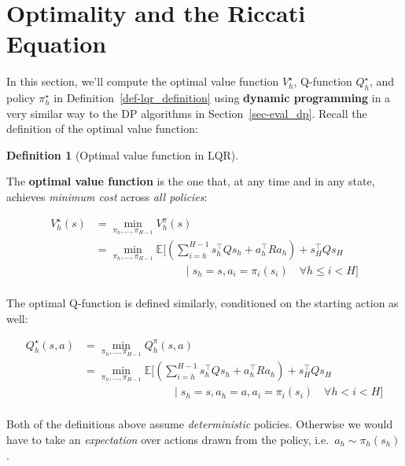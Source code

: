 \documentclass[
  letterpaper,
  DIV=11,
  numbers=noendperiod]{scrreprt}
\theoremstyle{plain}
\theoremstyle{plain}
\theoremstyle{definition}
\theoremstyle{definition}
\newtheorem{definition}{Definition}[chapter]
\theoremstyle{remark}
\begin{document}
\section{Optimality and the Riccati Equation}\label{sec-optimal_lqr}

In this section, we'll compute the optimal value function \(V^\star_h\),
Q-function \(Q^\star_h\), and policy \(\pi^\star_h\) in
Definition~\ref{def-lqr_definition} using \textbf{dynamic programming}
in a very similar way to the DP algorithms in Section~\ref{sec-eval_dp}.
Recall the definition of the optimal value function:

\begin{definition}[Optimal value function in
LQR]\protect\hypertarget{def-optimal_value_lqr}{}\label{def-optimal_value_lqr}

The \textbf{optimal value function} is the one that, at any time and in
any state, achieves \emph{minimum cost} across \emph{all policies}:

\[
\begin{split}
    V^\star_h(s) &= \min_{\pi_h, \dots, \pi_{H-1}} V^\pi_h(s) \\
    &= \min_{\pi_{h}, \dots, \pi_{H-1}} \mathbb{E}\bigg[ \left( \sum_{i=h}^{H-1} s_h^\top Q s_h+ a_h^\top R a_h\right) + s_H^\top Q s_H\\
        &\hspace{8em} \mid s_h= s, a_i = \pi_i(s_i) \quad \forall h\le i < H \bigg] \\
\end{split}
\]

The optimal Q-function is defined similarly, conditioned on the starting
action as well:

\[
\begin{split}
    Q^\star_h(s, a) &= \min_{\pi_h, \dots, \pi_{H-1}} Q^\pi_h(s, a) \\
    &= \min_{\pi_{h}, \dots, \pi_{H-1}} \mathbb{E}\bigg[ \left( \sum_{i=h}^{H-1} s_h^\top Q s_h+ a_h^\top R a_h\right) + s_H^\top Q s_H\\
        &\hspace{8em} \mid s_h= s, a_h= a, a_i = \pi_i(s_i) \quad \forall h< i < H \bigg] \\
\end{split}
\]

Both of the definitions above assume \emph{deterministic} policies.
Otherwise we would have to take an \emph{expectation} over actions drawn
from the policy, i.e.~\(a_h\sim \pi_h(s_h)\).

\end{definition}
\end{document}
